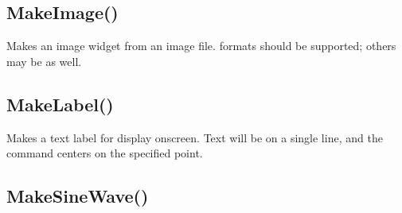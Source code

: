 \documentclass[letterpaper,10pt,english]{sphinxmanual}
\begin{document}
\ignorespaces 

\subsection{MakeImage()}
\label{\detokenize{reference/peblobjects:makeimage}}\label{\detokenize{reference/peblobjects:index-26}}
\sphinxAtStartPar
{}

\sphinxAtStartPar
{}

\sphinxAtStartPar
Makes an image widget from an image file.                formats should be supported; others may be as well.

\sphinxAtStartPar
{}

\begin{sphinxVerbatim}[commandchars=\\\{\}]
\end{sphinxVerbatim}

\ignorespaces 

\subsection{MakeLabel()}
\label{\detokenize{reference/peblobjects:makelabel}}\label{\detokenize{reference/peblobjects:index-27}}
\sphinxAtStartPar
{}

\sphinxAtStartPar
Makes a text label for display on\sphinxhyphen{}screen. Text will   be on a single line, and the  command centers    on the specified point.

\sphinxAtStartPar
{}

\begin{sphinxVerbatim}[commandchars=\\\{\}]
\end{sphinxVerbatim}

\ignorespaces 

\subsection{MakeSineWave()}
\label{\detokenize{reference/peblobjects:makesinewave}}\label{\detokenize{reference/peblobjects:index-28}}
\sphinxAtStartPar
{}
\end{document}
